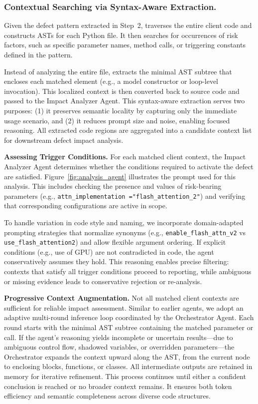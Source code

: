 \subsubsection{Contextual Searching via Syntax-Aware Extraction.}
Given the defect pattern extracted in Step~2, \appname traverses the entire client code and constructs ASTs for each Python file. 
It then searches for occurrences of risk factors, such as specific parameter names, method calls, or triggering constants defined in the pattern.

Instead of analyzing the entire file, \appname extracts the minimal AST subtree that encloses each matched element (e.g., a model constructor or loop-level invocation). 
This localized context is then converted back to source code and passed to the Impact Analyzer Agent.
This syntax-aware extraction serves two purposes: (1) it preserves semantic locality by capturing only the immediate usage scenario, and (2) it reduces prompt size and noise, enabling focused reasoning. 
All extracted code regions are aggregated into a candidate context list for downstream defect impact analysis.


\noindent\textbf{Assessing Trigger Conditions.}
For each matched client context, the Impact Analyzer Agent determines whether the conditions required to activate the defect are satisfied. 
Figure~\ref{fig:analysis_agent} illustrates the prompt used for this analysis.
This includes checking the presence and values of risk-bearing parameters (e.g., \texttt{attn\_implementation ="flash\_attention\_2"}) and verifying that corresponding configurations are active in scope.

To handle variation in code style and naming, we incorporate domain-adapted prompting strategies that normalize synonyms (e.g., \texttt{enable\_flash\_attn\_v2} vs \texttt{use\_flash\_attention2}) and allow flexible argument ordering. 
If explicit conditions (e.g., use of GPU) are not contradicted in code, the agent conservatively assumes they hold.
This reasoning enables precise filtering: contexts that satisfy all trigger conditions proceed to reporting, while ambiguous or missing evidence leads to conservative rejection or re-analysis.


\noindent \textbf{Progressive Context Augmentation.}
Not all matched client contexts are sufficient for reliable impact assessment.
Similar to earlier agents, we adopt an adaptive multi-round inference loop coordinated by the Orchestrator Agent.
Each round starts with the minimal AST subtree containing the matched parameter or call.
If the agent’s reasoning yields incomplete or uncertain results—due to ambiguous control flow, shadowed variables, or overridden parameters—the Orchestrator expands the context upward along the AST, from the current node to enclosing blocks, functions, or classes.
All intermediate outputs are retained in memory for iterative refinement.
This process continues until either a confident conclusion is reached or no broader context remains.
It ensures both token efficiency and semantic completeness across diverse code structures.

